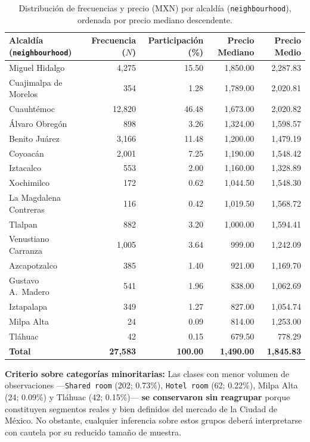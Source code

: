 \documentclass[12pt,letterpaper,oneside]{report}
\begin{document}
\begin{table}[htbp]
\centering
\caption{Distribución de frecuencias y precio (MXN) por alcaldía (\texttt{neighbourhood}), ordenada por precio mediano descendente.}
\label{tab:cat_neighbourhood}
\scriptsize
\renewcommand{\arraystretch}{1.12}
\begin{tabular}{l r r r r}
\toprule
\rowcolor{TableHeader}
\textbf{Alcaldía (\texttt{neighbourhood})} & \textbf{Frecuencia ($N$)} & \textbf{Participación (\%)} & \textbf{Precio Mediano} & \textbf{Precio Medio} \\
\midrule
Miguel Hidalgo          &  4,275 & 15.50 & 1,850.00 & 2,287.83 \\
Cuajimalpa de Morelos   &    354 &  1.28 & 1,789.00 & 2,020.81 \\
Cuauhtémoc              & 12,820 & 46.48 & 1,673.00 & 2,020.82 \\
Álvaro Obregón          &    898 &  3.26 & 1,324.00 & 1,598.57 \\
Benito Juárez           &  3,166 & 11.48 & 1,200.00 & 1,479.19 \\
Coyoacán                &  2,001 &  7.25 & 1,190.00 & 1,548.42 \\
Iztacalco               &    553 &  2.00 & 1,160.00 & 1,328.89 \\
Xochimilco              &    172 &  0.62 & 1,044.50 & 1,548.30 \\
La Magdalena Contreras  &    116 &  0.42 & 1,019.50 & 1,568.72 \\
Tlalpan                 &    882 &  3.20 & 1,000.00 & 1,594.41 \\
Venustiano Carranza     &  1,005 &  3.64 &   999.00 & 1,242.09 \\
Azcapotzalco            &    385 &  1.40 &   921.00 & 1,169.70 \\
Gustavo A.\ Madero      &    541 &  1.96 &   838.00 & 1,062.69 \\
Iztapalapa              &    349 &  1.27 &   827.00 & 1,054.74 \\
Milpa Alta              &     24 &  0.09 &   814.00 & 1,253.00 \\
Tláhuac                 &     42 &  0.15 &   679.50 &   778.29 \\
\midrule
\textbf{Total}          & \textbf{27,583} & \textbf{100.00} & \textbf{1,490.00} & \textbf{1,845.83} \\
\bottomrule
\end{tabular}
\end{table}

\textbf{Criterio sobre categorías minoritarias:} Las clases con menor volumen de observaciones ---\texttt{Shared room} (202; 0.73\%), \texttt{Hotel room} (62; 0.22\%), Milpa Alta (24; 0.09\%) y Tláhuac (42; 0.15\%)--- \textbf{se conservaron sin reagrupar} porque constituyen segmentos reales y bien definidos del mercado de la Ciudad de México. No obstante, cualquier inferencia sobre estos grupos deberá interpretarse con cautela por su reducido tamaño de muestra.
\end{document}
